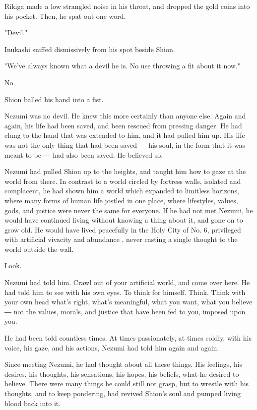 Rikiga made a low strangled noise in his throat, and dropped the gold
coins into his pocket. Then, he spat out one word.

"Devil."

Inukashi sniffed dismissively from his spot beside Shion.

"We've always known what a devil he is. No use throwing a fit about it
now."

No.

Shion balled his hand into a fist.

Nezumi was no devil. He knew this more certainly than anyone else. Again
and again, his life had been saved, and been rescued from pressing
danger. He had clung to the hand that was extended to him, and it had
pulled him up. His life was not the only thing that had been saved ― his
soul, in the form that it was meant to be ― had also been saved. He
believed so.

Nezumi had pulled Shion up to the heights, and taught him how to gaze at
the world from there. In contrast to a world circled by fortress walls,
isolated and complacent, he had shown him a world which expanded to
limitless horizons, where many forms of human life jostled in one place,
where lifestyles, values, gods, and justice were never the same for
everyone. If he had not met Nezumi, he would have continued living
without knowing a thing about it, and gone on to grow old. He would have
lived peacefully in the Holy City of No. 6, privileged with artificial
vivacity and abundance , never casting a single thought to the world
outside the wall.

Look.

Nezumi had told him. Crawl out of your artificial world, and come over
here. He had told him to see with his own eyes. To think for himself.
Think. Think with your own head what's right, what's meaningful, what
you want, what you believe ― not the values, morals, and justice that
have been fed to you, imposed upon you.

He had been told countless times. At times passionately, at times
coldly, with his voice, his gaze, and his actions, Nezumi had told him
again and again.

Since meeting Nezumi, he had thought about all these things. His
feelings, his desires, his thoughts, his sensations, his hopes, his
beliefs, what he desired to believe. There were many things he could
still not grasp, but to wrestle with his thoughts, and to keep
pondering, had revived Shion's soul and pumped living blood back into
it.

